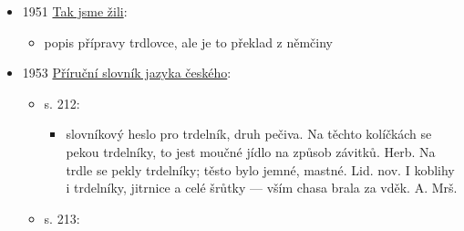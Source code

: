 \begin{itemize}
  \begin{itemize}
  \tightlist
  \item
    Výživa lidu : časopis Společnosti pro racionální výživu. 15.09.1950.
    Praha: Avicenum, roč. 5, s. 198. ISSN 0042-9414.
  \item
     \emph{Slovenské krajové typické jedlá}
  \item
    popisuje jednotlivý regiony Slovenska a tradiční místní jídla
  \item
    autorka asi pochází ze Skalice, vzpomíná jak maminka kdysi pekla na
    svatbu trdelníky. Vždycky se dělaly jen na svatby nebo jiné významné
    příležitosti, protože jejich příprava byla nákladná a namáhavá.
  \item
    recept: 1 kg krupicové mouky, 15 dkg husího sádla nebo másla, 15 dkg
    cukru, 4-5 žloutků, 2 dkg droždí, sůl, mlíko podle potřeby. Udělá se
    tužší těsto a nechá vykynout.
  \item
    pak se vyválí dlouhé na prst tlusté válečky, které se vedle sebe
    těsně natáčejí na dobře pomaštěný dřevěný válec, dlouhý jako trouba,
    na každém konci má železnou tyč, která se dá na cihly, který se dají
    do trouby dozadu a dopředu. Válec má průměr asi 6 cm. Na válcích
    nakynuté těsto se potře rozšlehaným vejcem a obalí v sekaných
    ořeších. Upečené těsto se z válce stáhne a posype moučkovým cukrem.
  \item
    pozn. red: dříve se pekly na zvláštních stojanech přímo nad žhavými
    uhlíky
  \end{itemize}
\item
  1951
  \href{https://ceskadigitalniknihovna.cz/view/uuid:20d0de00-02ba-11e5-9506-005056827e51?page=uuid\%3Ad5741950-0ec5-11e5-b562-005056827e51&fulltext=trdlovec*\%20OR\%20trdlovcem&source=mzk}{Tak
  jsme žili}:

  \begin{itemize}
  \tightlist
  \item
    popis přípravy trdlovce, ale je to překlad z němčiny
  \end{itemize}
\item
  1953
  \href{https://ceskadigitalniknihovna.cz/uuid/uuid:b65792bb-dbc4-4d41-b1da-e0aec484459d}{Příruční
  slovník jazyka českého}:

  \begin{itemize}
  \tightlist
  \item
    s. 212:

    \begin{itemize}
    \tightlist
    \item
      slovníkový heslo pro trdelník, druh pečiva. Na těchto kolíčkách se
      pekou trdelníky, to jest moučné jídlo na způsob závitků. Herb. Na
      trdle se pekly trdelníky; těsto bylo jemné, mastné. Lid. nov. I
      koblihy i trdelníky, jitrnice a celé šrůtky --- vším chasa brala
      za vděk. A. Mrš.
    \end{itemize}
  \item
    s. 213:


\end{itemize}
\end{itemize}
